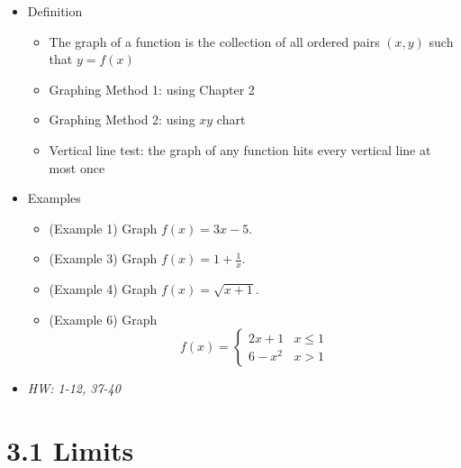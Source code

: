 \documentclass[11pt]{article}
\begin{document}
\begin{itemize}
\item Definition
  \begin{itemize}
    \item The graph of a function is the collection of all ordered pairs
      \((x,y)\) such that \(y=f(x)\)
    \item Graphing Method 1: using Chapter 2
    \item Graphing Method 2: using \(xy\) chart
    \item Vertical line test: the graph of any function hits every vertical
      line at most once
  \end{itemize}
\item Examples
  \begin{itemize}
  \item (Example 1) Graph \(f(x)=3x-5\).
  \item (Example 3) Graph \(f(x)=1+\frac{1}{x}\).
  \item (Example 4) Graph \(f(x)=\sqrt{x+1}\).
  \item (Example 6) Graph
    \[
      f(x)=
        \begin{cases}
          2x+1 & x\leq 1 \\
          6-x^2 & x>1
        \end{cases}
    \]
  \end{itemize}

\item\textit{
  HW: 1-12, 37-40
}
\end{itemize}

\section*{3.1 Limits}
\end{document}
